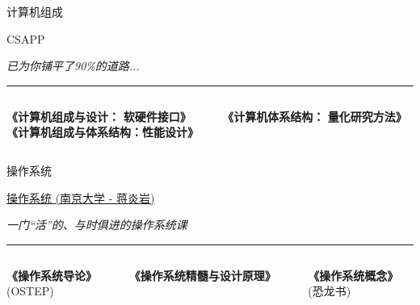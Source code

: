 \documentclass{beamer}
\newcommand{\hrefcol}[2]{\textcolor{cyan}{\href{#1}{#2}}}
\begin{document}
\begin{frame}{计算机组成}
    \begin{center}
        \huge CSAPP
        \vspace{0.5cm}
        
        \Large\textit{已为你铺平了90\%的道路...}
    \end{center}

    \vfill %
    \rule{\textwidth}{0.4pt}
    \vspace{0.1cm}
    

    \begin{columns}[T]
        \begin{column}{0.5\textwidth}
            \begin{center}
                \textbf{《计算机组成与设计：}  \textbf{软硬件接口》}\\
                \textbf{《计算机组成与体系结构：性能设计》}
            \end{center}
        \end{column}
        \begin{column}{0.5\textwidth}
            \begin{center}
                \textbf{《计算机体系结构：}  \textbf{量化研究方法》}
            \end{center}
        \end{column}
    \end{columns}
\end{frame}

\begin{frame}{操作系统}
    \begin{center}
        \huge \hrefcol{https://jyywiki.cn/OS/2022/index.html}{操作系统 (南京大学 - 蒋炎岩)}
        \vspace{0.5cm}
        
        \large\textit{一门“活”的、与时俱进的操作系统课}
    \end{center}

    \vfill
    \rule{\textwidth}{0.4pt}
    \vspace{0.3cm}
    

    \begin{columns}[T]
        \begin{column}{0.33\textwidth}
            \centering
            \vspace{0.5cm}
            \textbf{《操作系统导论》} \\ \small(OSTEP)
        \end{column}
        \begin{column}{0.33\textwidth}
            \centering
            \vspace{0.5cm}
            \textbf{《操作系统精髓与设计原理》}
        \end{column}
        \begin{column}{0.33\textwidth}
            \centering
            \vspace{0.5cm}
            \textbf{《操作系统概念》} \\ \small(恐龙书)
        \end{column}
    \end{columns}
\end{frame}
\end{document}
